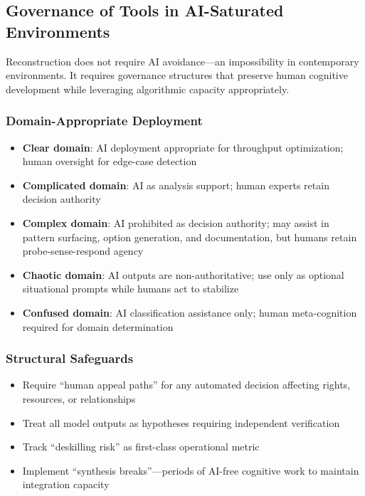 \subsection{Governance of Tools in AI-Saturated Environments}
\label{sec:governance}

Reconstruction does not require AI avoidance---an impossibility in contemporary environments. It requires governance structures that preserve human cognitive development while leveraging algorithmic capacity appropriately.

\subsubsection{Domain-Appropriate Deployment}

\begin{itemize}
\item \textbf{Clear domain}: AI deployment appropriate for throughput optimization; human oversight for edge-case detection
\item \textbf{Complicated domain}: AI as analysis support; human experts retain decision authority
\item \textbf{Complex domain}: AI prohibited as decision authority; may assist in pattern surfacing, option generation, and documentation, but humans retain probe-sense-respond agency
\item \textbf{Chaotic domain}: AI outputs are non-authoritative; use only as optional situational prompts while humans act to stabilize
\item \textbf{Confused domain}: AI classification assistance only; human meta-cognition required for domain determination
\end{itemize}

\subsubsection{Structural Safeguards}

\begin{itemize}
\item Require ``human appeal paths'' for any automated decision affecting rights, resources, or relationships
\item Treat all model outputs as hypotheses requiring independent verification
\item Track ``deskilling risk'' as first-class operational metric
\item Implement ``synthesis breaks''---periods of AI-free cognitive work to maintain integration capacity
\end{itemize}

